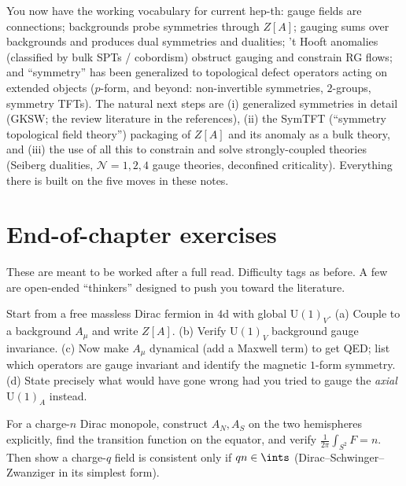\documentclass[11pt]{article}
\newcommand{\Uone}{\mathrm{U}(1)}
\begin{document}
\begin{ppreview}
You now have the working vocabulary for current hep-th: gauge fields are connections;
backgrounds probe symmetries through $Z[A]$; gauging sums over backgrounds and produces
dual symmetries and dualities; 't Hooft anomalies (classified by bulk SPTs / cobordism)
obstruct gauging and constrain RG flows; and ``symmetry'' has been generalized to
topological defect operators acting on extended objects ($p$-form, and beyond:
non-invertible symmetries, $2$-groups, symmetry TFTs). The natural next steps are
(i) generalized symmetries in detail (GKSW; the review literature in the references),
(ii) the SymTFT (``symmetry topological field theory'') packaging of $Z[A]$ and its
anomaly as a bulk theory, and (iii) the use of all this to constrain and solve
strongly-coupled theories (Seiberg dualities, $\mathcal N{=}1,2,4$ gauge theories,
deconfined criticality). Everything there is built on the five moves in these notes.
\end{ppreview}

\section{End-of-chapter exercises}

\noindent
These are meant to be worked after a full read. Difficulty tags as before. A few are
open-ended ``thinkers'' designed to push you toward the literature.

\begin{xca}
Start from a free massless Dirac fermion in $4$d with global $\Uone_V$. (a) Couple to a
background $A_\mu$ and write $Z[A]$. (b) Verify $\Uone_V$ background gauge invariance.
(c) Now make $A_\mu$ dynamical (add a Maxwell term) to get QED; list which operators are
gauge invariant and identify the magnetic $1$-form symmetry. (d) State precisely what
would have gone wrong had you tried to gauge the \emph{axial} $\Uone_A$ instead.
\end{xca}

\begin{xca}
For a charge-$n$ Dirac monopole, construct $A_N,A_S$ on the two hemispheres explicitly,
find the transition function on the equator, and verify $\frac1{2\pi}\int_{S^2}F=n$.
Then show a charge-$q$ field is consistent only if $qn\in\ints$
(Dirac--Schwinger--Zwanziger in its simplest form).
\end{xca}
\end{document}
